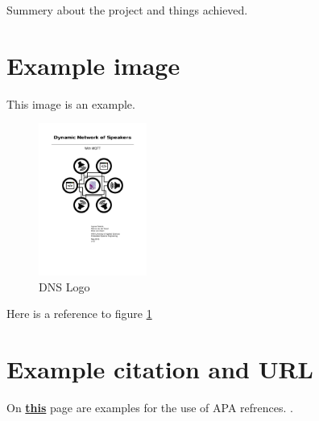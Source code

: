 Summery about the project and things achieved.

\section*{Example image}
This image is an example.

\begin{figure}[h]
    \centering
    \includegraphics[height=5cm]{dynamic_network_of_speakers}
    \caption{DNS Logo}
    \label{fig:DNS Logo}
\end{figure}

Here is a reference to figure \ref{fig:DNS Logo}

\section*{Example citation and URL}
On \href{https://en.wikibooks.org/wiki/LaTeX/Bibliography_Management#Standard_templates}{\textbf{this}} page are examples for the use of APA refrences. \cite{BiberTemplates}.

